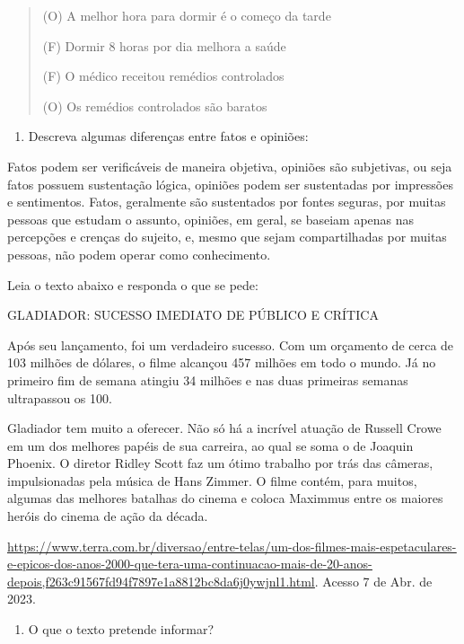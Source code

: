 {\begin{quote}
(O) A melhor hora para dormir é o começo da tarde

(F) Dormir 8 horas por dia melhora a saúde

(F) O médico receitou remédios controlados

(O) Os remédios controlados são baratos
\end{quote}

\begin{enumerate}
\def\labelenumi{\arabic{enumi})}
\setcounter{enumi}{1}
\tightlist
\item
  Descreva algumas diferenças entre fatos e opiniões:
\end{enumerate}

Fatos podem ser verificáveis de maneira objetiva, opiniões são
subjetivas, ou seja fatos possuem sustentação lógica, opiniões podem ser
sustentadas por impressões e sentimentos. Fatos, geralmente são
sustentados por fontes seguras, por muitas pessoas que estudam o
assunto, opiniões, em geral, se baseiam apenas nas percepções e crenças
do sujeito, e, mesmo que sejam compartilhadas por muitas pessoas, não
podem operar como conhecimento.

Leia o texto abaixo e responda o que se pede:

GLADIADOR: SUCESSO IMEDIATO DE PÚBLICO E CRÍTICA

Após seu lançamento, foi um verdadeiro sucesso. Com um orçamento de
cerca de 103 milhões de dólares, o filme alcançou 457 milhões em todo o
mundo. Já no primeiro fim de semana atingiu 34 milhões e nas duas
primeiras semanas ultrapassou os 100.

Gladiador tem muito a oferecer. Não só há a incrível atuação de Russell
Crowe em um dos melhores papéis de sua carreira, ao qual se soma o de
Joaquin Phoenix. O diretor Ridley Scott faz um ótimo trabalho por trás
das câmeras, impulsionadas pela música de Hans Zimmer. O filme contém,
para muitos, algumas das melhores batalhas do cinema e coloca Maximmus
entre os maiores heróis do cinema de ação da década.

\href{https://www.terra.com.br/diversao/entre-telas/um-dos-filmes-mais-espetaculares-e-epicos-dos-anos-2000-que-tera-uma-continuacao-mais-de-20-anos-depois,f263c91567fd94f7897e1a8812bc8da6j0ywjnl1.html}{\uline{https://www.terra.com.br/diversao/entre-telas/um-dos-filmes-mais-espetaculares-e-epicos-dos-anos-2000-que-tera-uma-continuacao-mais-de-20-anos-depois,f263c91567fd94f7897e1a8812bc8da6j0ywjnl1.html}}.
Acesso 7 de Abr. de 2023.

\begin{enumerate}
\def\labelenumi{\arabic{enumi})}
\setcounter{enumi}{2}
\tightlist
\item
  O que o texto pretende informar?
\end{enumerate}

}
